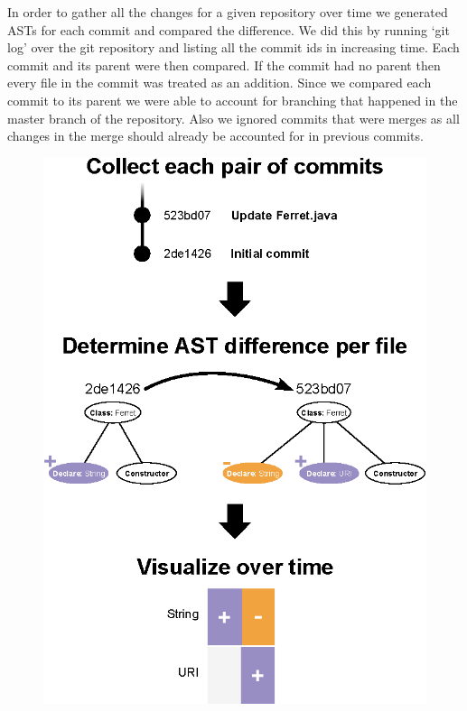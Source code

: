 \documentclass[conference]{IEEEtran}
\begin{document}
In order to gather all the changes for a given repository over time we generated ASTs for each commit and compared the difference. We did this by running ‘git log’ over the git repository and listing all the commit ids in increasing time. Each commit and its parent were then compared. If the commit had no parent then every file in the commit was treated as an addition. Since we compared each commit to its parent we were able to account for branching that happened in the master branch of the repository. Also we ignored commits that were merges as all changes in the merge should already be accounted for in previous commits.

\begin{figure}[!h]
\centering
\includegraphics[width=\columnwidth]{context}
\caption{}
\label{fig:context}
\end{figure}
\end{document}
